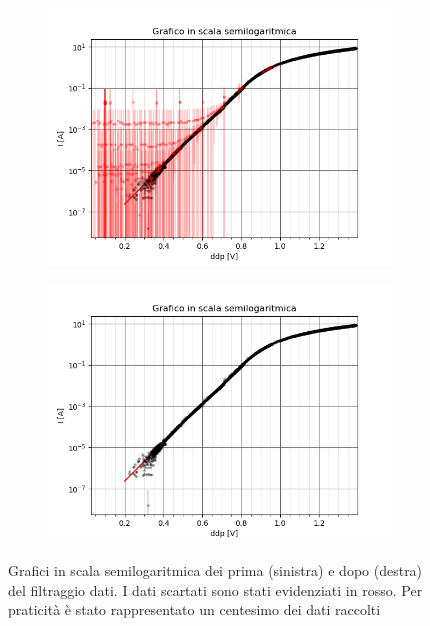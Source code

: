 \documentclass{article}[a4paper, oneside, 11pt]
\begin{document}
\begin{figure}[H]
\centering
\begin{subfigure}{.5\textwidth}
	\centering 
 		\includegraphics[scale=0.5]{./nofilter.png}
	\label{fig: nofilter}
\end{subfigure}%
\begin{subfigure}{.5\textwidth}
	\centering 
 		\includegraphics[scale=0.5]{./filtered.png}
	\label{fig: filtered}
\end{subfigure}
	\caption{Grafici in scala semilogaritmica dei prima (sinistra) e dopo 
(destra) del filtraggio dati. I dati scartati sono stati evidenziati in rosso. 
Per praticità è stato rappresentato un centesimo dei dati raccolti}
\end{figure}
\end{document}
